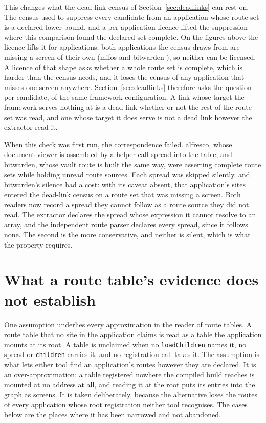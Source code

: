 This changes what the dead-link census of Section~\ref{sec:deadlinks} can rest on. The census used to suppress every candidate from an application whose route set is a declared lower bound, and a per-application licence lifted the suppression where this comparison found the declared set complete. On the figures above the licence lifts it for \RoundTwoProbeLifted{} applications: both applications the census draws from are missing a screen of their own (mifos \ProbeMissedMifos{} and bitwarden \ProbeMissedBitwarden{}), so neither can be licensed. A licence of that shape asks whether a whole route set is complete, which is harder than the census needs, and it loses the census of any application that misses one screen anywhere. Section~\ref{sec:deadlinks} therefore asks the question per candidate, of the same framework configuration. A link whose target the framework serves nothing at is a dead link whether or not the rest of the route set was read, and one whose target it does serve is not a dead link however the extractor read it.

When this check was first run, the correspondence failed. alfresco, whose document viewer is assembled by a helper call spread into the table, and bitwarden, whose vault route is built the same way, were asserting complete route sets while holding unread route sources. Each spread was skipped silently, and bitwarden's silence had a cost: with its caveat absent, that application's sites entered the dead-link census on a route set that was missing a screen. Both readers now record a spread they cannot follow as a route source they did not read. The extractor declares the spread whose expression it cannot resolve to an array, and the independent route parser declares every spread, since it follows none. The second is the more conservative, and neither is silent, which is what the property requires.

\section{What a route table's evidence does not establish}
\label{sec:ownership}

One assumption underlies every approximation in the reader of route tables. A route table that no site in the application claims is read as a table the application mounts at its root. A table is unclaimed when no \texttt{loadChildren} names it, no spread or \texttt{children} carries it, and no registration call takes it. The assumption is what lets either tool find an application's routes however they are declared. It is an over-approximation: a table registered nowhere the compiled build reaches is mounted at no address at all, and reading it at the root puts its entries into the graph as screens. It is taken deliberately, because the alternative loses the routes of every application whose root registration neither tool recognises. The cases below are the places where it has been narrowed and not abandoned.

